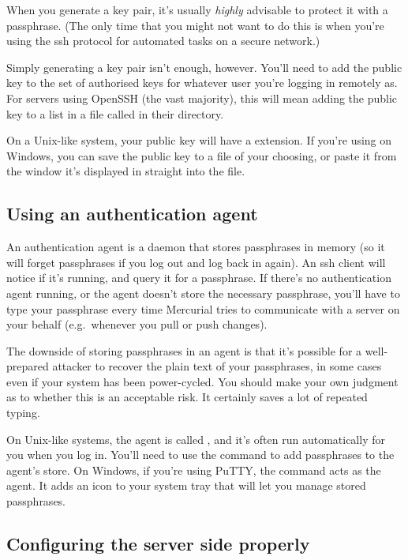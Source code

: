 When you generate a key pair, it's usually \emph{highly} advisable to
protect it with a passphrase.  (The only time that you might not want
to do this is when you're using the ssh protocol for automated tasks
on a secure network.)

Simply generating a key pair isn't enough, however.  You'll need to
add the public key to the set of authorised keys for whatever user
you're logging in remotely as.  For servers using OpenSSH (the vast
majority), this will mean adding the public key to a list in a file
called  in their 
directory.

On a Unix-like system, your public key will have a 
extension.  If you're using  on Windows, you can
save the public key to a file of your choosing, or paste it from the
window it's displayed in straight into the
 file.

\subsection{Using an authentication agent}

An authentication agent is a daemon that stores passphrases in memory
(so it will forget passphrases if you log out and log back in again).
An ssh client will notice if it's running, and query it for a
passphrase.  If there's no authentication agent running, or the agent
doesn't store the necessary passphrase, you'll have to type your
passphrase every time Mercurial tries to communicate with a server on
your behalf (e.g.~whenever you pull or push changes).

The downside of storing passphrases in an agent is that it's possible
for a well-prepared attacker to recover the plain text of your
passphrases, in some cases even if your system has been power-cycled.
You should make your own judgment as to whether this is an acceptable
risk.  It certainly saves a lot of repeated typing.

On Unix-like systems, the agent is called , and
it's often run automatically for you when you log in.  You'll need to
use the  command to add passphrases to the agent's
store.  On Windows, if you're using PuTTY, the 
command acts as the agent.  It adds an icon to your system tray that
will let you manage stored passphrases.

\subsection{Configuring the server side properly}

